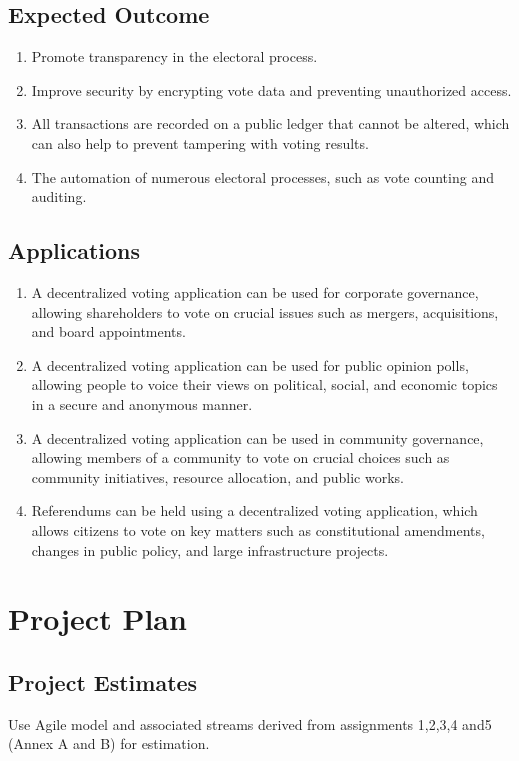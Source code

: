 \documentclass[oneside, 12pt]{book}
\begin{document}
		\subsection{Expected Outcome}
			\begin{enumerate}
				\item Promote transparency in the electoral process.
				\item Improve security by encrypting vote data and preventing unauthorized access.
				\item All transactions are recorded on a public ledger that cannot be altered, which can also help to prevent tampering with voting results.
				\item The automation of numerous electoral processes, such as vote counting and auditing.
			\end{enumerate}
		\subsection{Applications}
			\begin{enumerate}
				\item A decentralized voting application can be used for corporate governance, allowing shareholders to vote on crucial issues such as mergers, acquisitions, and board appointments.
				\item A decentralized voting application can be used for public opinion polls, allowing people to voice their views on political, social, and economic topics in a secure and anonymous manner.
				\item A decentralized voting application can be used in community governance, allowing members of a community to vote on crucial choices such as community initiatives, resource allocation, and public works.
				\item Referendums can be held using a decentralized voting application, which allows citizens to vote on key matters such as constitutional amendments, changes in public policy, and large infrastructure projects.
			\end{enumerate}
	\newpage
	\section{Project Plan}
	\newpage
		\subsection{Project Estimates}
			Use Agile model and associated streams derived from assignments 1,2,3,4 and5 (Annex A and B) for estimation.
\end{document}
